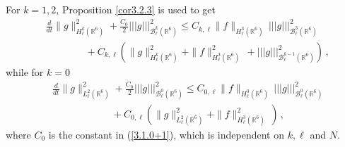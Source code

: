 \documentclass{amsart}[12pt, article]
\begin{document}
For $k=1, 2$, Proposition \ref{cor3.2.3} is used to get
\begin{align}\label{4.0.3+1}
&\frac{d}{d t}\|g\|^2_{H^k_\ell({{{\mathbb R}}}^6)}+\frac{C_0}{2}
|||g|||^2_{{{\mathcal B}}^{k}_\ell({{{\mathbb R}}}^6)}\leq C_{k, \ell}
\|f\|_{H^3_\ell({{{\mathbb R}}}^6)} \,
|||g|||^2_{{{\mathcal B}}^{3}_\ell({{{\mathbb R}}}^6)}\\
&\qquad\qquad+C_{k, \ell}\left( \|g\|^2_{H^{k}_\ell({{{\mathbb R}}}^6)}+
\|f\|^2_{H^3_\ell({{{\mathbb R}}}^6)} \, +|||g|||^2_{{{\mathcal B}}^{k-1}_\ell({{{\mathbb R}}}^6)}
 \right)\,,\nonumber
\end{align}
while for $k=0$
\begin{align}\label{4.0.4}
&\frac{d}{d t}\|g\|^2_{L^2_\ell({{{\mathbb R}}}^6)}+\frac{C_0}{2}
|||g|||^2_{{{\mathcal B}}^{0}_\ell({{{\mathbb R}}}^6)}\leq C_{0, \ell}
\|f\|_{H^3_\ell({{{\mathbb R}}}^6)} \,
|||g|||^2_{{{\mathcal B}}^{0}_\ell({{{\mathbb R}}}^6)}\\
&\qquad\qquad\qquad+C_{0, \ell}\left( \|g\|^2_{L^{2}_\ell({{{\mathbb R}}}^6)}+
\|f\|^2_{H^3_\ell({{{\mathbb R}}}^6)} \,
 \right)\,, \nonumber
\end{align}
where $C_0$ is the constant in (\ref{3.1.0+1}), which is
independent on $k, \ell$ and $N$.
\end{document}
